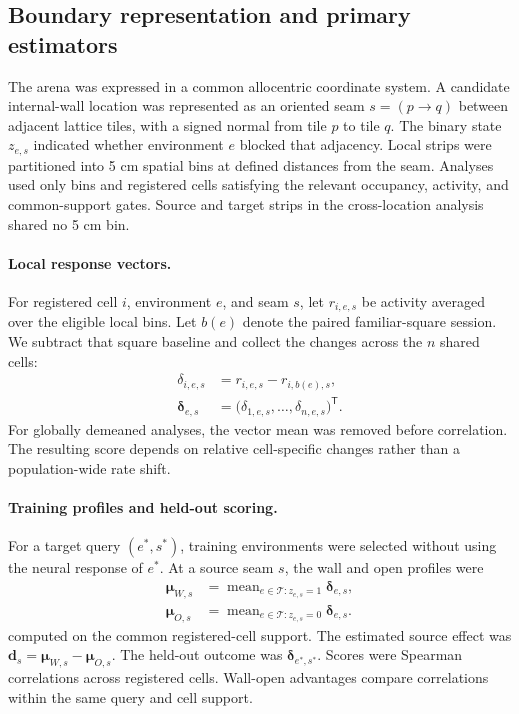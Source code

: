 \documentclass[10pt,twocolumn]{article}
\begin{document}
\subsection{Boundary representation and primary estimators}

The arena was expressed in a common allocentric coordinate system. A candidate
internal-wall location was represented as an oriented seam \(s=(p\rightarrow
q)\) between adjacent lattice tiles, with a signed normal from tile \(p\) to
tile \(q\). The binary state \(z_{e,s}\) indicated whether environment \(e\)
blocked that adjacency. Local strips were partitioned into 5 cm spatial bins
at defined distances from the seam. Analyses used only bins and registered
cells satisfying the relevant occupancy, activity, and common-support gates.
Source and target strips in the cross-location analysis shared no 5 cm bin.

\paragraph{Local response vectors.}

For registered cell \(i\), environment \(e\), and seam \(s\), let
\(r_{i,e,s}\) be activity averaged over the eligible local bins. Let \(b(e)\)
denote the paired familiar-square session. We subtract that square baseline and
collect the changes across the \(n\) shared cells:
\begin{equation}
\begin{aligned}
  \delta_{i,e,s}
    &= r_{i,e,s}-r_{i,b(e),s},\\
  \boldsymbol{\delta}_{e,s}
    &= \bigl(\delta_{1,e,s},\ldots,\delta_{n,e,s}\bigr)^{\mathsf T}.
\end{aligned}
\label{eq:local-response-vector}
\end{equation}
For globally demeaned analyses, the vector mean was removed before correlation.
The resulting score depends on relative cell-specific changes rather than a
population-wide rate shift.

\paragraph{Training profiles and held-out scoring.}

For a target query \((e^\ast,s^\ast)\), training environments were selected
without using the neural response of \(e^\ast\). At a source seam \(s\), the
wall and open profiles were
\[
\begin{aligned}
 \boldsymbol{\mu}_{W,s}
   &= \operatorname{mean}_{e\in\mathcal T:z_{e,s}=1}
      \boldsymbol{\delta}_{e,s},\\
 \boldsymbol{\mu}_{O,s}
   &= \operatorname{mean}_{e\in\mathcal T:z_{e,s}=0}
      \boldsymbol{\delta}_{e,s}.
\end{aligned}
\]
computed on the common registered-cell support. The estimated source effect was
\(\mathbf d_s=\boldsymbol{\mu}_{W,s}-\boldsymbol{\mu}_{O,s}\).
The held-out outcome was \(\boldsymbol{\delta}_{e^\ast,s^\ast}\).
Scores were Spearman correlations across registered cells. Wall-open
advantages compare correlations within the same query and cell support.
\end{document}
